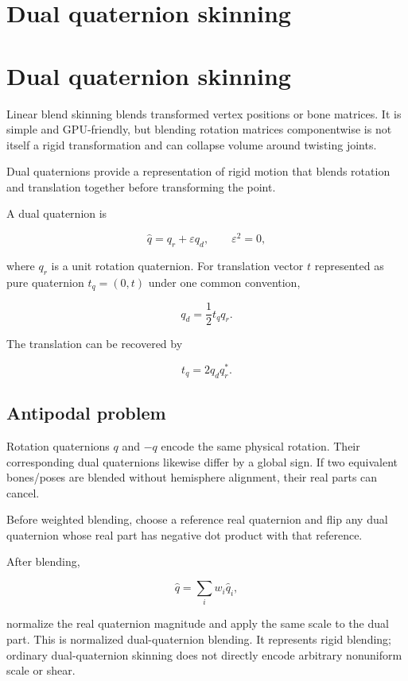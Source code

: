 \hypertarget{appendix-921f3f2efb53}{}
\section*{Dual quaternion skinning}
\section{Dual quaternion skinning}\label{appendix-921f3f2efb53-dual-quaternion-skinning}

Linear blend skinning blends transformed vertex positions or bone matrices. It is simple and GPU-friendly, but blending rotation matrices componentwise is not itself a rigid transformation and can collapse volume around twisting joints.

Dual quaternions provide a representation of rigid motion that blends rotation and translation together before transforming the point.

A dual quaternion is

\[
\hat q=q_r+\varepsilon q_d,
\qquad \varepsilon^2=0,
\]

where \(q_r\) is a unit rotation quaternion. For translation vector \(t\) represented as pure quaternion \(t_q=(0,t)\) under one common convention,

\[
q_d=\frac12 t_q q_r.
\]

The translation can be recovered by

\[
t_q=2q_dq_r^*.
\]

\subsection{Antipodal problem}\label{appendix-921f3f2efb53-antipodal-problem}

Rotation quaternions \(q\) and \(-q\) encode the same physical rotation. Their corresponding dual quaternions likewise differ by a global sign. If two equivalent bones/poses are blended without hemisphere alignment, their real parts can cancel.

Before weighted blending, choose a reference real quaternion and flip any dual quaternion whose real part has negative dot product with that reference.

After blending,

\[
\hat q = \sum_i w_i \hat q_i,
\]

normalize the real quaternion magnitude and apply the same scale to the dual part. This is normalized dual-quaternion blending. It represents rigid blending; ordinary dual-quaternion skinning does not directly encode arbitrary nonuniform scale or shear.

